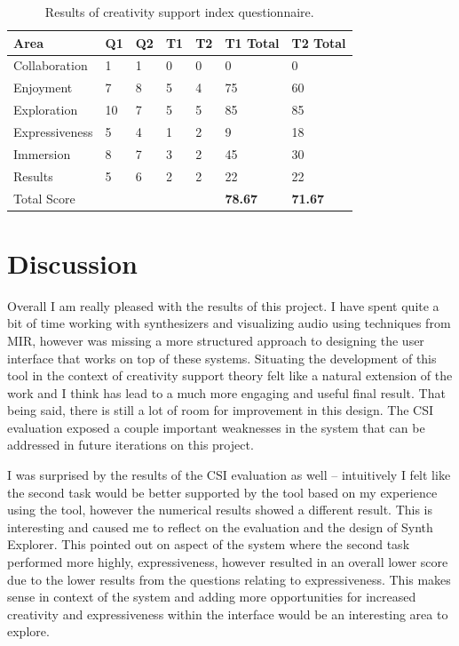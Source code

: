 \begin{table}[th]
\centering
\begin{tabular}{l|llll|ll}
Area           & Q1 & Q2 & T1 & T2 & T1 Total   & T2 Total \\
\hline
Collaboration  & 1  & 1  & 0            & 0            & 0              & 0            \\
Enjoyment      & 7  & 8  & 5            & 4            & 75             & 60           \\
Exploration    & 10 & 7  & 5            & 5            & 85             & 85           \\
Expressiveness & 5  & 4  & 1            & 2            & 9              & 18           \\
Immersion      & 8  & 7  & 3            & 2            & 45             & 30           \\
Results        & 5  & 6  & 2            & 2            & 22             & 22           \\
Total Score    &    &    &              &              & \textbf{78.67} & \textbf{71.67} 
\end{tabular}
\caption{Results of creativity support index questionnaire.}
\label{table:csi}
\end{table}

\section{Discussion}
Overall I am really pleased with the results of this project. I have spent quite a bit of time working with synthesizers and visualizing audio using techniques from MIR, however was missing a more structured approach to designing the user interface that works on top of these systems. Situating the development of this tool in the context of creativity support theory felt like a natural extension of the work and I think has lead to a much more engaging and useful final result. That being said, there is still a lot of room for improvement in this design. The CSI evaluation exposed a couple important weaknesses in the system that can be addressed in future iterations on this project.

I was surprised by the results of the CSI evaluation as well -- intuitively I felt like the second task would be better supported by the tool based on my experience using the tool, however the numerical results showed a different result. This is interesting and caused me to reflect on the evaluation and the design of Synth Explorer. This pointed out on aspect of the system where the second task performed more highly, expressiveness, however resulted in an overall lower score due to the lower results from the questions relating to expressiveness. This makes sense in context of the system and adding more opportunities for increased creativity and expressiveness within the interface would be an interesting area to explore.

